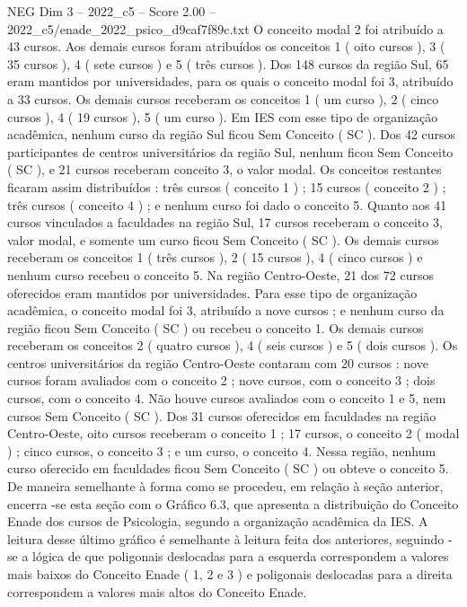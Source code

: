 \begin{textsample}{NEG Dim 3 – 2022\_c5 – Score 2.00 – 2022\_c5/enade\_2022\_psico\_d9caf7f89c.txt}
O conceito modal 2 foi atribuído a 43 cursos.
Aos demais cursos foram atribuídos os conceitos 1 ( oito cursos ), 3 ( 35 cursos ), 4 ( sete cursos ) e 5 ( três cursos ).
Dos 148 cursos da região Sul, 65 eram mantidos por universidades, para os quais o conceito modal foi 3, atribuído a 33 cursos.
Os demais cursos receberam os conceitos 1 ( um curso ), 2 ( cinco cursos ), 4 ( 19 cursos ), 5 ( um curso ).
Em IES com esse tipo de organização acadêmica, nenhum curso da região Sul ficou Sem Conceito ( SC ).
Dos 42 cursos participantes de centros universitários da região Sul, nenhum ficou Sem Conceito ( SC ), e 21 cursos receberam conceito 3, o valor modal.
Os conceitos restantes ficaram assim distribuídos : três cursos ( conceito 1 ) ; 15 cursos ( conceito 2 ) ; três cursos ( conceito 4 ) ; e nenhum curso foi dado o conceito 5.
Quanto aos 41 cursos vinculados a faculdades na região Sul, 17 cursos receberam o conceito 3, valor modal, e somente um curso ficou Sem Conceito ( SC ).
Os demais cursos receberam os conceitos 1 ( três cursos ), 2 ( 15 cursos ), 4 ( cinco cursos ) e nenhum curso recebeu o conceito 5.
Na região Centro-Oeste, 21 dos 72 cursos oferecidos eram mantidos por universidades.
Para esse tipo de organização acadêmica, o conceito modal foi 3, atribuído a nove cursos ; e nenhum curso da região ficou Sem Conceito ( SC ) ou recebeu o conceito 1.
Os demais cursos receberam os conceitos 2 ( quatro cursos ), 4 ( seis cursos ) e 5 ( dois cursos ).
Os centros universitários da região Centro-Oeste contaram com 20 cursos : nove cursos foram avaliados com o conceito 2 ; nove cursos, com o conceito 3 ; dois cursos, com o conceito 4.
Não houve cursos avaliados com o conceito 1 e 5, nem cursos Sem Conceito ( SC ).
Dos 31 cursos oferecidos em faculdades na região Centro-Oeste, oito cursos receberam o conceito 1 ; 17 cursos, o conceito 2 ( modal ) ; cinco cursos, o conceito 3 ; e um curso, o conceito 4.
Nessa região, nenhum curso oferecido em faculdades ficou Sem Conceito ( SC ) ou obteve o conceito 5.
De maneira semelhante à forma como se procedeu, em relação à seção anterior, encerra -se esta seção com o Gráfico 6.3, que apresenta a distribuição do Conceito Enade dos cursos de Psicologia, segundo a organização acadêmica da IES.
A leitura desse último gráfico é semelhante à leitura feita dos anteriores, seguindo -se a lógica de que poligonais deslocadas para a esquerda correspondem a valores mais baixos do Conceito Enade ( 1, 2 e 3 ) e poligonais deslocadas para a direita correspondem a valores mais altos do Conceito Enade.

\end{textsample}
